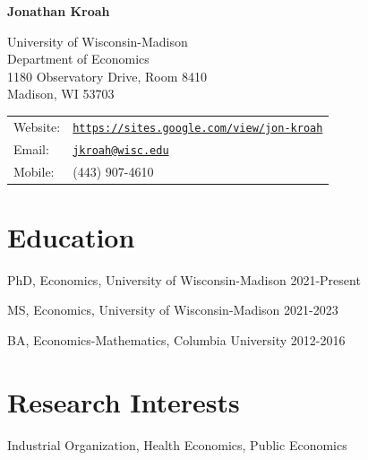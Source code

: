 \documentclass[letterpaper]{article}
\def\name{Jonathan Kroah}
\renewenvironment{itemize}{
	\begin{list}{}{
			\setlength{\leftmargin}{1.5em}
		}
	}{
	\end{list}
}
\begin{document}
	
	
	\centerline{\huge \bf \name}
	
	\vspace{0.25in}
	
	\begin{minipage}{0.45\linewidth}
		University of Wisconsin-Madison \\
		Department of Economics \\
		1180 Observatory Drive, Room 8410 \\
		Madison, WI 53703
	\end{minipage}
	\begin{minipage}{0.45\linewidth}
		\begin{tabular}{ll}
			Website: & \href{https://sites.google.com/view/jon-kroah}{\tt https://sites.google.com/view/jon-kroah} \\
			Email: & \href{mailto:jkroah@wisc.edu}{\tt jkroah@wisc.edu} \\
			Mobile: & (443) 907-4610 \\
		\end{tabular}
	\end{minipage}
	
	
	\section*{Education}
	\begin{itemize}
		\item PhD, Economics, University of Wisconsin-Madison \hfill 2021-Present
		\item MS, Economics, University of Wisconsin-Madison \hfill 2021-2023
		\item BA, Economics-Mathematics, Columbia University \hfill 2012-2016
	\end{itemize}
	
	
	\section*{Research Interests}
	\begin{itemize}
		\item Industrial Organization, Health Economics, Public Economics
	\end{itemize}
	
\end{document}
